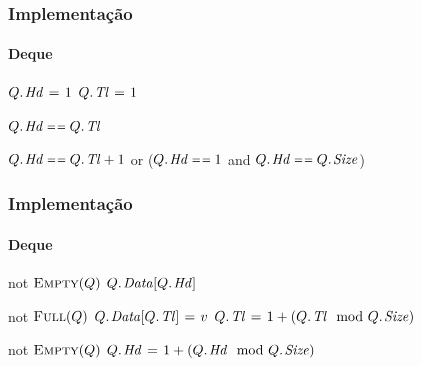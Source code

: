 \documentclass{beamer}
\begin{document}
\begin{frame}

  \frametitle{Implementação}
  \framesubtitle{Deque}

\begin{codebox}
\li $\attrib{Q}{Hd} \gets 1$
\li $\attrib{Q}{Tl} \gets 1$
\end{codebox}
\begin{codebox}
\li  \Return $\attrib{Q}{Hd} \isequal \attrib{Q}{Tl}$
\end{codebox}
\begin{codebox}
\li  \Return $\attrib{Q}{Hd} \isequal \attrib{Q}{Tl} + 1$ or
\li  \> ($\attrib{Q}{Hd} \isequal 1$ and $\attrib{Q}{Hd} \isequal \attrib{Q}{Size}$)
\end{codebox}

\end{frame}

\begin{frame}

  \frametitle{Implementação}
  \framesubtitle{Deque}

\begin{codebox}
\li  \If not $\textnormal{\scshape Empty}(Q)$
\li    \Then \Return $\attrib{Q}{Data}[\attrib{Q}{Hd}]$
     \End
\end{codebox}
\begin{codebox}
\li  \If not $\textnormal{\scshape Full}(Q)$
\li    \Then $\attrib{Q}{Data}[\attrib{Q}{Tl}] \gets v$
\li      $\attrib{Q}{Tl} \gets 1 + (\attrib{Q}{Tl} \mod \attrib{Q}{Size})$
     \End
\end{codebox}
\begin{codebox}
\li  \If not $\textnormal{\scshape Empty}(Q)$
\li    \Then $\attrib{Q}{Hd} \gets 1 + (\attrib{Q}{Hd} \mod \attrib{Q}{Size})$
     \End
\end{codebox}

\end{frame}
\end{document}
